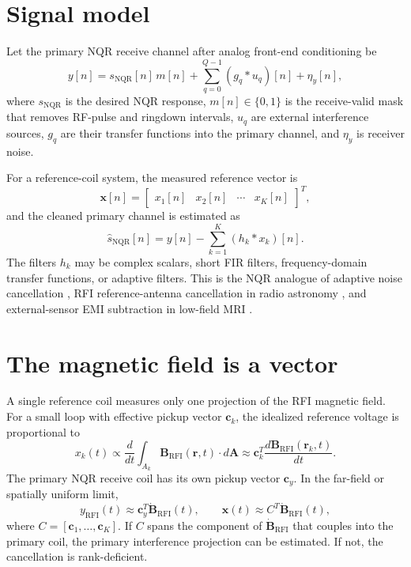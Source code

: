 \documentclass[10pt]{article}
\newcommand{\B}{\mathbf B}
\newcommand{\cvec}{\mathbf c}
\newcommand{\xvec}{\mathbf x}
\newcommand{\NQR}{\mathrm{NQR}}
\newcommand{\RFI}{\mathrm{RFI}}
\begin{document}
\section{Signal model}

Let the primary NQR receive channel after analog front-end conditioning be
\begin{equation}
  y[n] = s_{\NQR}[n]\,m[n]
       + \sum_{q=0}^{Q-1} (g_q * u_q)[n]
       + \eta_y[n],
  \label{eq:scalar-primary}
\end{equation}
where \(s_{\NQR}\) is the desired NQR response, \(m[n]\in\{0,1\}\) is the
receive-valid mask that removes RF-pulse and ringdown intervals, \(u_q\) are
external interference sources, \(g_q\) are their transfer functions into the
primary channel, and \(\eta_y\) is receiver noise.

For a reference-coil system, the measured reference vector is
\begin{equation}
  \xvec[n] =
  \begin{bmatrix}x_1[n]&x_2[n]&\cdots&x_K[n]\end{bmatrix}^{T},
\end{equation}
and the cleaned primary channel is estimated as
\begin{equation}
  \widehat{s}_{\NQR}[n]
    = y[n] - \sum_{k=1}^{K}(h_k*x_k)[n].
  \label{eq:mimo-canceller}
\end{equation}
The filters \(h_k\) may be complex scalars, short FIR filters, frequency-domain
transfer functions, or adaptive filters.  This is the NQR analogue of adaptive
noise cancellation \cite{widrow1975,haykin2002}, RFI reference-antenna
cancellation in radio astronomy \cite{mitchell2010,finger2018}, and
external-sensor EMI subtraction in low-field MRI \cite{srinivas2021}.

\section{The magnetic field is a vector}

A single reference coil measures only one projection of the RFI magnetic field.
For a small loop with effective pickup vector \(\cvec_k\), the idealized
reference voltage is proportional to
\begin{equation}
  x_k(t) \propto
  \frac{d}{dt}\int_{A_k}\B_{\RFI}(\mathbf r,t)\cdot d\mathbf A
  \approx
  \cvec_k^{T}\frac{d\B_{\RFI}(\mathbf r_k,t)}{dt}.
\end{equation}
The primary NQR receive coil has its own pickup vector \(\cvec_y\).  In the
far-field or spatially uniform limit,
\begin{equation}
  y_{\RFI}(t)\approx \cvec_y^{T}\dot{\B}_{\RFI}(t),
  \qquad
  \xvec(t)\approx C^{T}\dot{\B}_{\RFI}(t),
\end{equation}
where \(C=[\cvec_1,\ldots,\cvec_K]\).  If \(C\) spans the component of
\(\dot{\B}_{\RFI}\) that couples into the primary coil, the primary interference
projection can be estimated.  If not, the cancellation is rank-deficient.
\end{document}
